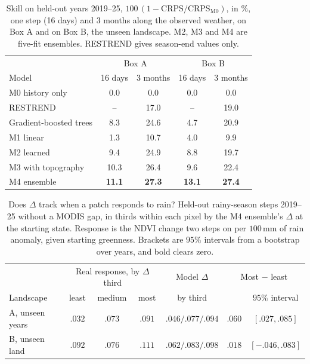 \documentclass[letterpaper]{article} %
\begin{document}
\begin{table}[t]\centering\caption{Skill on held-out years 2019--25, $100\,(1-\mathrm{CRPS}/\mathrm{CRPS}_{\mathrm{M0}})$, in $\%$, one step (16 days) and 3 months along the observed weather, on Box A and on Box B, the unseen landscape. M2, M3 and M4 are five-fit ensembles. RESTREND gives season-end values only.}\label{tab:onestep}\footnotesize\setlength{\tabcolsep}{3pt}
\begin{tabular}{lcccc}\toprule
 & \multicolumn{2}{c}{Box A} & \multicolumn{2}{c}{Box B}\\
Model & 16 days & 3 months & 16 days & 3 months\\\midrule
M0 history only & 0.0 & 0.0 & 0.0 & 0.0\\
RESTREND & -- & 17.0 & -- & 19.0\\
Gradient-boosted trees & 8.3 & 24.6 & 4.7 & 20.9\\
M1 linear & 1.3 & 10.7 & 4.0 & 9.9\\
M2 learned & 9.4 & 24.9 & 8.8 & 19.7\\
M3 with topography & 10.3 & 26.4 & 9.6 & 22.4\\
M4 ensemble & \textbf{11.1} & \textbf{27.3} & \textbf{13.1} & \textbf{27.4}\\
\bottomrule\end{tabular}\end{table}

\begin{table}[t]\centering\footnotesize\setlength{\tabcolsep}{3pt}
\caption{Does $\Delta$ track when a patch responds to rain? Held-out rainy-season steps 2019--25 without a MODIS gap, in thirds within each pixel by the M4 ensemble's $\Delta$ at the starting state. Response is the NDVI change two steps on per $100$\,mm of rain anomaly, given starting greenness. Brackets are $95\%$ intervals from a bootstrap over years, and bold clears zero.}\label{tab:greeks}
\begin{tabular}{lcccccc}\toprule
 & \multicolumn{3}{c}{Real response, by $\Delta$ third} & Model $\Delta$ & \multicolumn{2}{c}{Most $-$ least}\\
Landscape & least & medium & most & by third & & $95\%$ interval\\\midrule
A, unseen years & $.032$ & $.073$ & $.091$ & $.046/.077/.094$ & $\mathbf{.060}$ & $[.027, .085]$\\
B, unseen land & $.092$ & $.076$ & $.111$ & $.062/.083/.098$ & $.018$ & $[-.046, .083]$\\\bottomrule
\end{tabular}
\end{table}
\end{document}
